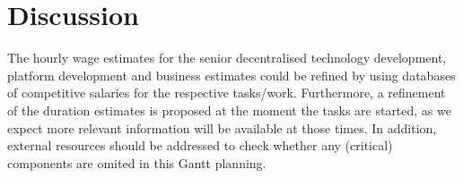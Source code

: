 \section{Discussion}\label{sec:discussion}
The hourly wage estimates for the senior decentralised technology development, platform development and business estimates could be refined by using databases of competitive salaries for the respective tasks/work. Furthermore, a refinement of the duration estimates is proposed at the moment the tasks are started, as we expect more relevant information will be available at those times. In addition, external resources should be addressed to check whether any (critical) components are omited in this Gantt planning.
